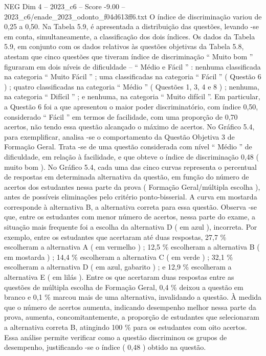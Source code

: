 \begin{textsample}{NEG Dim 4 – 2023\_c6 – Score -9.00 – 2023\_c6/enade\_2023\_odonto\_f04d613ff6.txt}
O índice de discriminação variou de 0,25 a 0,50.
Na Tabela 5.9, é apresentada a distribuição das questões, levando -se em conta, simultaneamente, a classificação dos dois índices.
Os dados da Tabela 5.9, em conjunto com os dados relativos às questões objetivas da Tabela 5.8, atestam que cinco questões que tiveram índice de discriminação “ Muito bom ” figuraram em dois níveis de dificuldade – “ Médio e Fácil ” : nenhuma classificada na categoria “ Muito Fácil ” ; uma classificadas na categoria “ Fácil ” ( Questão 6 ) ; quatro classificadas na categoria “ Médio ” ( Questões 1, 3, 4 e 8 ) ; nenhuma, na categoria “ Difícil ” ; e nenhuma, na categoria “ Muito difícil ”.
Em particular, a Questão 6 foi a que apresentou o maior poder discriminatório, com índice 0,50, considerado “ Fácil ” em termos de facilidade, com uma proporção de 0,70 acertos, não tendo essa questão alcançado o máximo de acertos.
No Gráfico 5.4, para exemplificar, analisa -se o comportamento da Questão Objetiva 3 de Formação Geral.
Trata -se de uma questão considerada com nível “ Médio ” de dificuldade, em relação à facilidade, e que obteve o índice de discriminação 0,48 ( muito bom ).
No Gráfico 5.4, cada uma das cinco curvas representa o percentual de respostas em determinada alternativa da questão, em função do número de acertos dos estudantes nessa parte da prova ( Formação Geral/múltipla escolha ), antes de possíveis eliminações pelo critério ponto-bisserial.
A curva em mostarda corresponde à alternativa B, a alternativa correta para essa questão.
Observa -se que, entre os estudantes com menor número de acertos, nessa parte do exame, a situação mais frequente foi a escolha da alternativa D ( em azul ), incorreta.
Por exemplo, entre os estudantes que acertaram até duas respostas, 27,7 \% escolheram a alternativa A ( em vermelho ) ; 12,5 \% escolheram a alternativa B ( em mostarda ) ; 14,4 \% escolheram a alternativa C ( em verde ) ; 32,1 \% escolheram a alternativa D ( em azul, gabarito ) ; e 12,9 \% escolheram a alternativa E ( em lilás ).
Entre os que acertaram duas respostas entre as questões de múltipla escolha de Formação Geral, 0,4 \% deixou a questão em branco e 0,1 \% marcou mais de uma alternativa, invalidando a questão.
À medida que o número de acertos aumenta, indicando desempenho melhor nessa parte da prova, aumenta, concomitantemente, a proporção de estudantes que selecionaram a alternativa correta B, atingindo 100 \% para os estudantes com oito acertos.
Essa análise permite verificar como a questão discriminou os grupos de desempenho, justificando -se o índice ( 0,48 ) obtido na questão.

\end{textsample}
